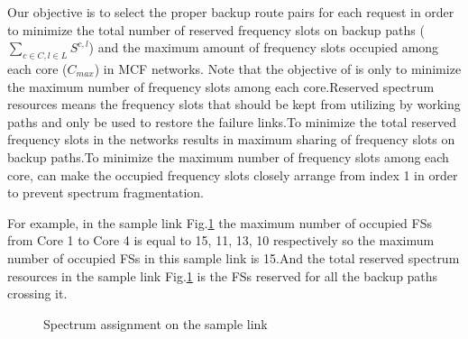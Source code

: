 \documentclass[a4paper,11pt]{report}
\begin{document}
  Our objective is to select the proper backup route pairs for each request in order to minimize the total number of reserved frequency slots on backup paths ($\sum\limits_{c\in C,l\in L} S^{c,l}$) and the maximum amount of frequency slots occupied among each core ($C^{}_{max}$) in MCF networks. Note that the objective of \cite{Hong Guo2016} is only to minimize the maximum number of frequency slots among each core.Reserved spectrum resources means the frequency slots that should be kept from utilizing by working paths and only be used to restore the failure links.To minimize the total reserved frequency slots in the networks results in maximum sharing of frequency slots on backup paths.To minimize the maximum number of frequency slots among each core, can make the occupied frequency slots closely arrange from index 1 in order to prevent spectrum fragmentation.\par
  For example, in the sample link Fig.\ref{figure:FSs assignment(fibre)} the maximum number of occupied FSs from Core 1 to Core 4 is equal to 15, 11, 13, 10 respectively so the maximum number of occupied FSs in this sample link is 15.And the total reserved spectrum resources in the sample link Fig.\ref{figure:FSs assignment(fibre)} is the FSs reserved for all the backup paths crossing it.\par

  \begin{figure}[htbp]
        \begin{center}
        \end{center}
        \caption{Spectrum assignment on the sample link}
        \label{figure:FSs assignment(fibre)}
        \end{figure}
      
\end{document}

